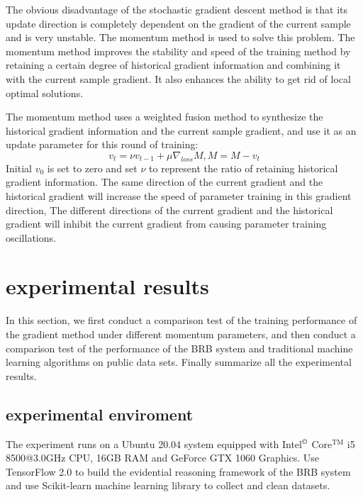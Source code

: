 \documentclass{ieeeaccess}
\begin{document}
The obvious disadvantage of the stochastic gradient descent method is that its update direction is completely dependent on the gradient of the current sample and is very unstable. The momentum method is used to solve this problem.
The momentum method improves the stability and speed of the training method by retaining a certain degree of historical gradient information and combining it with the current sample gradient.
It also enhances the ability to get rid of local optimal solutions.

The momentum method uses a weighted fusion method to synthesize the historical gradient information and the current sample gradient,
and use it as an update parameter for this round of training:
$$v_t=\nu v_{t-1}+\mu\nabla_{loss}M,M=M-v_t$$
Initial $v_0$ is set to zero and set $\nu$ to represent the ratio of retaining historical gradient information.
The same direction of the current gradient and the historical gradient will increase the speed of parameter training in this gradient direction,
The different directions of the current gradient and the historical gradient will inhibit the current gradient from causing parameter training oscillations.

\section{experimental results}
In this section,
we first conduct a comparison test of the training performance of the gradient method under different momentum parameters,
and then conduct a comparison test of the performance of the BRB system and traditional machine learning algorithms on public data sets.
Finally summarize all the experimental results.

\subsection{experimental enviroment}
The experiment runs on a Ubuntu 20.04 system equipped with Intel$^\copyright$ Core$^\text{TM}$ i5 8500@3.0GHz CPU, 16GB RAM and GeForce GTX 1060 Graphics.
Use TensorFlow 2.0 to build the evidential reasoning framework of the BRB system and
use Scikit-learn machine learning library to collect and clean datasets.
\end{document}
